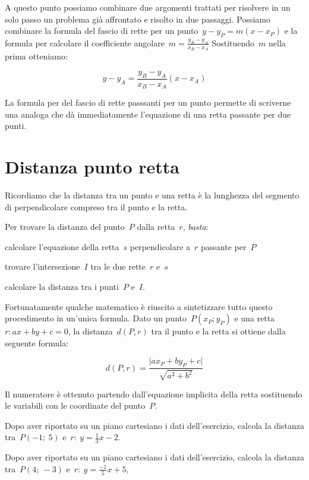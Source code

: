 A questo punto possiamo combinare due argomenti trattati per risolvere in un
solo passo un problema già affrontato e risolto in due passaggi. 
Possiamo combinare la formula del fascio di rette per un 
punto~$y - y_P = m (x - x_P)$
e la formula per calcolare il 
coefficiente angolare~$m = \frac{y_B - y_A}{x_B - x_A}$ 
Sostituendo~$m$ nella prima otteniamo:

$$y - y_A = \frac{y_B - y_A}{x_B - x_A} (x - x_A)$$

La formula per del fascio di rette passsanti per un punto permette di 
scriverne una analoga che dà immediatamente l'equazione di una retta passante 
per due punti.

\section{Distanza punto retta}
\label{sec:retta_distanzapuntoretta}

Ricordiamo che la distanza tra un punto e una retta è la lunghezza del 
segmento di perpendicolare compreso tra il punto e la retta.


\begin{procedura}
 Per trovare la distanza del punto~$P$ dalla retta~$r$, \emph{basta}:
 \begin{enumeratea}
  \item calcolare l'equazione della retta~$s$ perpendicolare a~$r$ passante 
   per~$P$
  \item trovare l'intersezione~$I$ tra le due rette~$r$ e~$s$
  \item calcolare la distanza tra i punti~$P$ e~$I$.
 \end{enumeratea}
\end{procedura}

Fortunatamente qualche matematico è riuscito a sintetizzare tutto questo 
procedimento in un'unica formula. 
Dato un punto~$P(x_P; y_P)$ e 
una retta~$r: ax+by+c=0$,
la distanza~$d(P, r)$ tra il punto e la retta si ottiene
dalla seguente formula:

\[d(P, r) = \frac{\lvert ax_P +by_P + c\rvert}{\sqrt{a^2 + b^2}}\]

Il numeratore è ottenuto partendo dall'equazione implicita della retta 
sostituendo le variabili con le coordinate del punto~$P$.

\begin{exrig}
 \begin{esempio}
  Dopo aver riportato su un piano cartesiano i dati dell'esercizio,
  calcola la distanza tra~$P(-1;~5)$ e~$r:~y = \frac{1}{3} x -2$. 
 \end{esempio}
 \begin{esempio}
  Dopo aver riportato su un piano cartesiano i dati dell'esercizio,
  calcola la distanza tra~$P(4;~-3)$ e~$r:~y = \frac{-1}{5} x +5$,
 \end{esempio}
\end{exrig}

